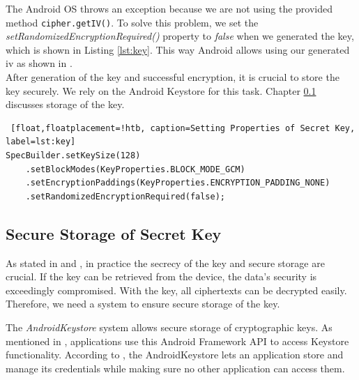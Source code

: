 The Android OS throws an exception because we are not using the provided method \texttt{cipher.getIV()}. To solve this problem, we set the \textit{setRandomizedEncryptionRequired()} property to \textit{false} when we generated the key, which is shown in Listing \ref{lst:key}. This way Android allows using our generated \gls{iv} as shown in \cite{SecretsInAndroid}. \\
After generation of the key and successful encryption, it is crucial to store the key securely. We rely on the Android Keystore for this task. Chapter \ref{arch_keystore} discusses storage of the key. \\


\begin{lstlisting} [float,floatplacement=!htb, caption=Setting Properties of Secret Key, label=lst:key]
SpecBuilder.setKeySize(128)
    .setBlockModes(KeyProperties.BLOCK_MODE_GCM)
    .setEncryptionPaddings(KeyProperties.ENCRYPTION_PADDING_NONE)
    .setRandomizedEncryptionRequired(false);
\end{lstlisting}




\subsection{Secure Storage of Secret Key} \label{arch_keystore}
As stated in \cite{dworkin2007sp} and \cite{CooijmansRP14},  in practice the secrecy of the key and secure storage are crucial. If the key can be retrieved from the device, the data's security is exceedingly compromised. With the key, all ciphertexts can be decrypted easily. Therefore, we need a system to ensure secure storage of the key.

The \textit{AndroidKeystore} system allows secure storage of cryptographic keys. As mentioned in \cite{HWBKeyStore}, applications use this Android Framework API  to access Keystore functionality. According to \cite{AndroidKeyStoreSystem}, the AndroidKeystore lets an application store and manage its credentials while making sure no other application can access them.

